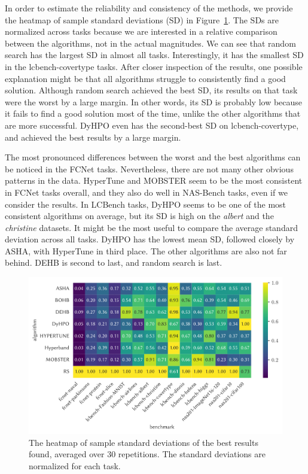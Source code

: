 In order to estimate the reliability and consistency of the methods, we provide the heatmap of sample standard deviations (SD) in Figure~\ref{fig:heatmap}. The SDs are normalized across tasks because we are interested in a relative comparison between the algorithms, not in the actual magnitudes. We can see that random search has the largest SD in almost all tasks. Interestingly, it has the smallest SD in the lcbench-covertype tasks. After closer inspection of the results, one possible explanation might be that all algorithms struggle to consistently find a good solution. Although random search achieved the best SD, its results on that task were the worst by a large margin. In other words, its SD is probably low because it fails to find a good solution most of the time, unlike the other algorithms that are more successful. DyHPO even has the second-best SD on lcbench-covertype, and achieved the best results by a large margin.

The most pronounced differences between the worst and the best algorithms can be noticed in the FCNet tasks. Nevertheless, there are not many other obvious patterns in the data. HyperTune and MOBSTER seem to be the most consistent in FCNet tasks overall, and they also do well in NAS-Bench tasks, even if we consider the results. In LCBench tasks, DyHPO seems to be one of the most consistent algorithms on average, but its SD is high on the \textit{albert} and the \textit{christine} datasets. It might be the most useful to compare the average standard deviation across all tasks. DyHPO has the lowest mean SD, followed closely by ASHA, with HyperTune in third place. The other algorithms are also not far behind. DEHB is second to last, and random search is last.

\begin{figure}[H]
    \centering
    \includegraphics[scale=0.75]{img/tabular_exp/stds_heatmap.pdf}
    \caption{The heatmap of sample standard deviations of the best results found, averaged over 30 repetitions. The standard deviations are normalized for each task.}
    \label{fig:heatmap}
\end{figure}


